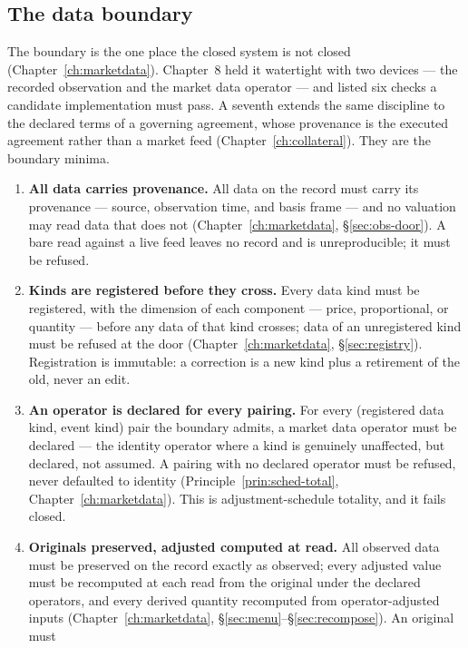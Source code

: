 \subsection{The data boundary}

The boundary is the one place the closed system is not closed
(Chapter~\ref{ch:marketdata}). Chapter~8 held it watertight with two devices --- the
recorded observation and the market data operator --- and listed six checks a candidate
implementation must pass. A seventh extends the same discipline to the declared terms of a
governing agreement, whose provenance is the executed agreement rather than a market feed
(Chapter~\ref{ch:collateral}). They are the boundary minima.

\begin{enumerate}[label=\textbf{B\arabic*.}, ref=B\arabic*, leftmargin=*, itemsep=3pt]
\item \textbf{All data carries provenance.} All data on the record must carry its
  provenance --- source, observation time, and basis frame --- and no valuation may read
  data that does not (Chapter~\ref{ch:marketdata}, \S\ref{sec:obs-door}). A bare read
  against a live feed leaves no record and is unreproducible; it must be refused.
\item \textbf{Kinds are registered before they cross.} Every data kind must be
  registered, with the dimension of each component --- price, proportional, or quantity ---
  before any data of that kind crosses; data of an unregistered kind must be refused at
  the door (Chapter~\ref{ch:marketdata}, \S\ref{sec:registry}). Registration is immutable:
  a correction is a new kind plus a retirement of the old, never an edit.
\item \textbf{An operator is declared for every pairing.} For every (registered data kind,
  event kind) pair the boundary admits, a market data operator must be declared --- the
  identity operator where a kind is genuinely unaffected, but declared, not assumed. A
  pairing with no declared operator must be refused, never defaulted to identity
  (Principle~\ref{prin:sched-total}, Chapter~\ref{ch:marketdata}). This is
  adjustment-schedule totality, and it fails closed.
\item \textbf{Originals preserved, adjusted computed at read.} All observed data must be
  preserved on the record exactly as observed; every adjusted value must be recomputed at
  each read from the original under the declared operators, and every derived quantity
  recomputed from operator-adjusted inputs
  (Chapter~\ref{ch:marketdata}, \S\ref{sec:menu}--\S\ref{sec:recompose}). An original must

\end{enumerate}
